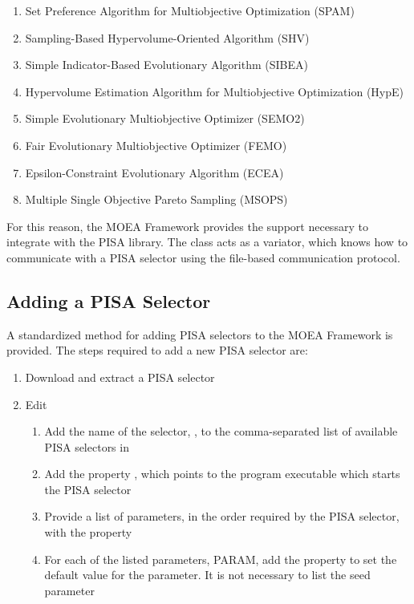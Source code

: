 \begin{enumerate}
  \item Set Preference Algorithm for Multiobjective Optimization (SPAM)
  \item Sampling-Based Hypervolume-Oriented Algorithm (SHV)
  \item Simple Indicator-Based Evolutionary Algorithm (SIBEA)
  \item Hypervolume Estimation Algorithm for Multiobjective Optimization (HypE)
  \item Simple Evolutionary Multiobjective Optimizer (SEMO2)
  \item Fair Evolutionary Multiobjective Optimizer (FEMO)
  \item Epsilon-Constraint Evolutionary Algorithm (ECEA)
  \item Multiple Single Objective Pareto Sampling (MSOPS)
\end{enumerate}

For this reason, the MOEA Framework provides the support necessary to integrate with the PISA library.  The  class acts as a variator, which knows how to communicate with a PISA selector using the file-based communication protocol.

\subsection{Adding a PISA Selector}
A standardized method for adding PISA selectors to the MOEA Framework is provided.  The steps required to add a new PISA selector are:

\begin{enumerate}
  \item Download and extract a PISA selector
  \item Edit 
    \begin{enumerate}
      \item Add the name of the selector, , to the comma-separated list of available PISA selectors in 
      \item Add the property , which points to the program executable which starts the PISA selector
      \item Provide a list of parameters, in the order required by the PISA selector, with the property 
      \item For each of the listed parameters, PARAM, add the property  to set the default value for the parameter.  It is not necessary to list the seed parameter
    \end{enumerate}
\end{enumerate}

